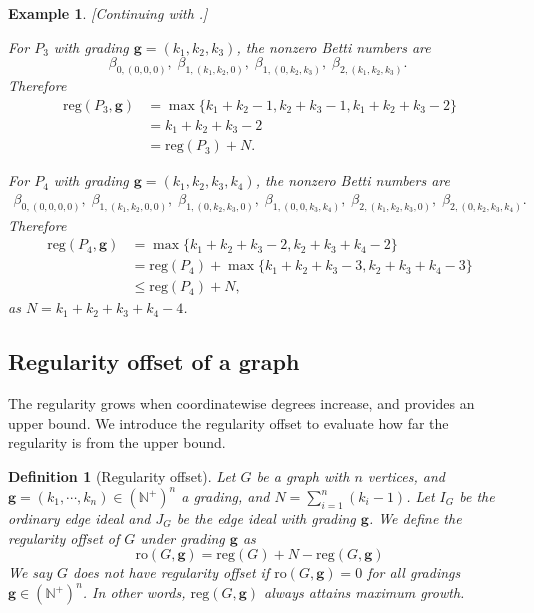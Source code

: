 \documentclass[dvipsnames,10pt]{article}
\newtheorem{defi}[theorem]{Definition}
\newtheorem{example}[theorem]{Example}
\begin{document}
\begin{example}
    [Continuing with .]

    For $P_3$ with grading $\mathbf{g}=(k_1,k_2,k_3)$, the nonzero Betti numbers are
    \begin{equation*}
        \beta_{0,(0,0,0)},\;\beta_{1,(k_1,k_2,0)},\;\beta_{1,(0,k_2,k_3)},\;\beta_{2,(k_1,k_2,k_3)}.\;
    \end{equation*}
    Therefore
    \begin{align*}
        \mathrm{reg}(P_3,\mathbf{g})&=\max\{k_1+k_2-1,k_2+k_3-1,k_1+k_2+k_3-2\}\\
        &= k_1+k_2+k_3-2\\
        &= \mathrm{reg}(P_3) + N.
    \end{align*}

    For $P_4$ with grading $\mathbf{g}=(k_1,k_2,k_3,k_4)$, the nonzero Betti numbers are
    \begin{align*}
        \beta_{0,(0,0,0,0)},\;\beta_{1,(k_1,k_2,0,0)},\;\beta_{1,(0,k_2,k_3,0)},\;\beta_{1,(0,0,k_3,k_4)},\;\beta_{2,(k_1,k_2,k_3,0)},\;\beta_{2,(0,k_2,k_3,k_4)}.
    \end{align*}
    Therefore
    \begin{align*}
        \mathrm{reg}(P_4,\mathbf{g})&=\max\{k_1+k_2+k_3-2,k_2+k_3+k_4-2\}\\
        &=\mathrm{reg}(P_4)+\max\{k_1+k_2+k_3-3,k_2+k_3+k_4-3\}\\
        &\leqslant\mathrm{reg}(P_4)+N,
    \end{align*}
    as $N=k_1+k_2+k_3+k_4-4$.
\end{example}

\subsection{Regularity offset of a graph} \label{tro}
The regularity grows when coordinatewise degrees increase, and  provides an upper bound. We introduce the regularity offset to evaluate how far the regularity is from the upper bound.

\begin{defi}[Regularity offset]
    Let $G$ be a graph with $n$ vertices, and $\mathbf{g}=(k_1,\cdots,k_n)\in(\mathbb{N}^+)^n$ a grading, and $N=\sum_{i=1}^{n} (k_i-1)$. Let $I_G$ be the ordinary edge ideal and $J_G$ be the edge ideal with grading $\mathbf{g}$. We define the regularity offset of $G$ under grading $\mathbf{g}$ as
    \begin{equation*}
        \mathrm{ro}(G,\mathbf{g})=\mathrm{reg}(G)+N-\mathrm{reg}(G,\mathbf{g})
    \end{equation*}
    We say $G$ does not have regularity offset if $\mathrm{ro}(G,\mathbf{g})= 0$ for all gradings $\mathbf{g}\in(\mathbb{N}^+)^n$. In other words, $\mathrm{reg}(G,\mathbf{g})$ always attains maximum growth.
\end{defi}
\end{document}
